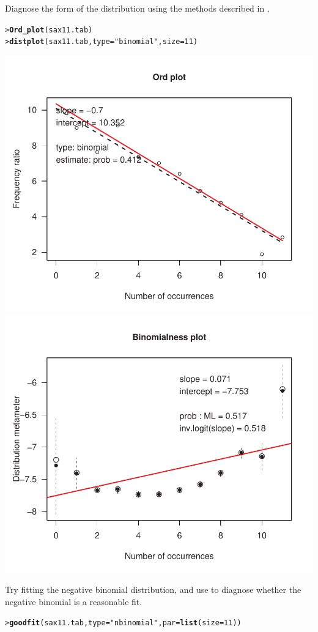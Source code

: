 \documentclass[10pt]{report}\usepackage[]{graphicx}\usepackage[]{color}
\makeatletter
\newcommand{\hlnum}[1]{\textcolor[rgb]{0.686,0.059,0.569}{#1}}%
\newcommand{\hlstr}[1]{\textcolor[rgb]{0.192,0.494,0.8}{#1}}%
\newcommand{\hlstd}[1]{\textcolor[rgb]{0.345,0.345,0.345}{#1}}%
\newcommand{\hlkwc}[1]{\textcolor[rgb]{0.333,0.667,0.333}{#1}}%
\newcommand{\hlkwd}[1]{\textcolor[rgb]{0.737,0.353,0.396}{\textbf{#1}}}%
\newenvironment{kframe}{%
 \def\at@end@of@kframe{}%
 \ifinner\ifhmode%
  \def\at@end@of@kframe{\end{minipage}}%
  \begin{minipage}{\columnwidth}%
 \fi\fi%
 \def\FrameCommand##1{\hskip\@totalleftmargin \hskip-\fboxsep
 \colorbox{shadecolor}{##1}\hskip-\fboxsep
     \hskip-\linewidth \hskip-\@totalleftmargin \hskip\columnwidth}%
 \MakeFramed {\advance\hsize-\width
   \@totalleftmargin\z@ \linewidth\hsize
   \@setminipage}}%
 {\par\unskip\endMakeFramed%
 \at@end@of@kframe}
\newenvironment{knitrout}{}{} %
\renewenvironment{knitrout}{\small\renewcommand{\baselinestretch}{.85}}{} %
\makeatother
\begin{document}
\begin{Exercises}
\begin{enumerate*}
    \item Diagnose the form of the distribution using the methods described in .
    \begin{ans}
\begin{knitrout}\footnotesize
{}\color{fgcolor}\begin{kframe}
\begin{alltt}
\hlstd{> }\hlkwd{Ord_plot}\hlstd{(sax11.tab)}
\hlstd{> }\hlkwd{distplot}\hlstd{(sax11.tab,} \hlkwc{type}\hlstd{=}\hlstr{"binomial"}\hlstd{,} \hlkwc{size}\hlstd{=}\hlnum{11}\hlstd{)}
\end{alltt}
\end{kframe}

\centerline{\includegraphics[width=.5\textwidth]{soln/fig/ex3_7c-1} 
\includegraphics[width=.5\textwidth]{soln/fig/ex3_7c-2} }



\end{knitrout}
    \end{ans}
    
    \item Try fitting the negative binomial distribution, and use  to diagnose
    whether the negative binomial is a reasonable fit.
    \begin{ans}
\begin{knitrout}\footnotesize
{}\color{fgcolor}\begin{kframe}
\begin{alltt}
\hlstd{> }\hlkwd{goodfit}\hlstd{(sax11.tab,} \hlkwc{type}\hlstd{=}\hlstr{"nbinomial"}\hlstd{,} \hlkwc{par}\hlstd{=}\hlkwd{list}\hlstd{(}\hlkwc{size}\hlstd{=}\hlnum{11}\hlstd{))}
\end{alltt}
\begin{verbatim}


\end{verbatim}
\end{kframe}
\end{knitrout}
\end{ans}
\end{enumerate*}
\end{Exercises}
\end{document}
